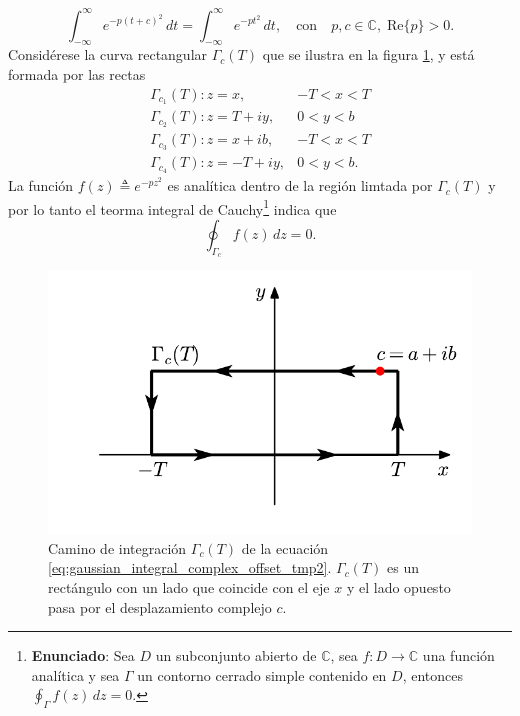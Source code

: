 \documentclass[a4paper]{report}
\begin{document}
\[
 \int_{-\infty}^{\infty}e^{-p(t+c)^2}\,dt = \int_{-\infty}^{\infty}e^{-pt^2}\,dt,\quad\textrm{con}\quad p,c\in\mathbb{C},\; \textrm{Re}\{p\}>0.
\]
Considérese la curva rectangular \(\Gamma_c(T)\) que se ilustra en la figura \ref{fig:gaussian_integral_complex_offset}, y está formada por las rectas  
\[
\begin{array}{lc}
\Gamma_{c_1}(T) : z=x,& -T<x<T \\
\Gamma_{c_2}(T) : z=T+iy,& 0<y<b \\ 
\Gamma_{c_3}(T) : z=x+ib,& -T<x<T \\
\Gamma_{c_4}(T) : z=-T+iy,& 0<y<b.
\end{array}
\]
La función \(f(z) \triangleq e^{-pz^2}\) es analítica dentro de la región limtada por \(\Gamma_c(T)\) y por lo tanto el teorma integral de Cauchy\footnote{\textbf{Enunciado}: Sea \(D\) un subconjunto abierto de \(\mathbb{C}\), sea \(f:D\rightarrow \mathbb{C}\) una función analítica y sea \(\Gamma\) un contorno cerrado simple contenido en \(D\), entonces \(\oint_\Gamma f(z)\,dz = 0\).} indica que
\begin{equation}\label{eq:gaussian_integral_complex_offset_tmp2}
 \oint_{\Gamma_c} f(z)\,dz = 0.
\end{equation}
\begin{figure}[!htb]
  \begin{minipage}[c]{0.5\textwidth}
    \includegraphics[width=\textwidth]{figuras/gaussian_integral_complex_offset.pdf}
  \end{minipage}\hfill
  \begin{minipage}[c]{0.47\textwidth}
    \caption{
       Camino de integración \(\Gamma_c(T)\) de la ecuación \ref{eq:gaussian_integral_complex_offset_tmp2}. \(\Gamma_c(T)\) es un rectángulo con un lado que coincide con el eje \(x\) y el lado opuesto pasa por el desplazamiento complejo \(c\).
    } \label{fig:gaussian_integral_complex_offset}
  \end{minipage}
\end{figure}
\end{document}
